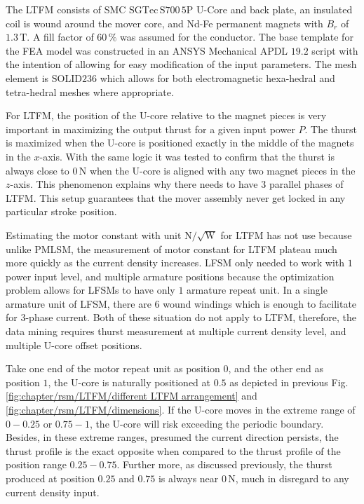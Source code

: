             
            The \acs{LTFM} consists of \acs{SMC} $\mathrm{SGTec\,S700\,5P}$ U-Core and back plate, an insulated coil is wound around the mover core, and Nd-Fe permanent magnets with $B_r$ of $1.3\,\mathrm{T}$. A fill factor of $60\,\%$ was assumed for the conductor.  The base template for the \acs{FEA} model was constructed in an ANSYS Mechanical APDL $19.2$ script with the intention of allowing for easy modification of the input parameters. The mesh element is $\mathrm{SOLID236}$ which allows for both electromagnetic hexa-hedral and tetra-hedral meshes where appropriate.
  
            
            For \acs{LTFM}, the position of the U-core relative to the magnet pieces is very important in maximizing the output thrust for a given input power $P$. The thurst is maximized when the U-core is positioned exactly in the middle of the magnets in the $x$-axis. With the same logic it was tested to confirm that the thurst is always close to $0\,\mathrm{N}$ when the U-core is aligned with any two magnet pieces in the $z$-axis. This phenomenon explains why there needs to have $3$ parallel phases of \acs{LTFM}. This setup guarantees that the mover assembly never get locked in any particular stroke position.
            
            
            Estimating the motor constant with unit $\mathrm{N/\sqrt{W}}$ for \acs{LTFM} has not use because unlike \acs{PMLSM}, the measurement of motor constant for \acs{LTFM} plateau much more quickly as the current density increases. \acs{LFSM} only needed to work with $1$ power input level, and multiple armature positions because the optimization problem allows for \acsp{LFSM} to have only $1$ armature repeat unit. In a single armature unit of \acs{LFSM}, there are $6$ wound windings which is enough to facilitate for 3-phase current. Both of these situation do not apply to \acs{LTFM}, therefore, the data mining requires thurst measurement at multiple current density level, and multiple U-core offset positions. 
            
            Take one end of the motor repeat unit as position $0$, and the other end as position $1$, the U-core is naturally positioned at $0.5$ as depicted in previous Fig.\,\ref{fig:chapter/rsm/LTFM/different LTFM arrangement} and \ref{fig:chapter/rsm/LTFM/dimensions}. If the U-core moves in the extreme range of $0-0.25$ or $0.75-1$, the U-core will risk exceeding the periodic boundary. Besides, in these extreme ranges, presumed the current direction persists, the thrust profile is the exact opposite when compared to the thrust profile of the position range $0.25-0.75$. Further more, as discussed previously, the thurst produced at position $0.25$ and $0.75$ is always near $0\,\mathrm{N}$, much in disregard to any current density input. 
            
